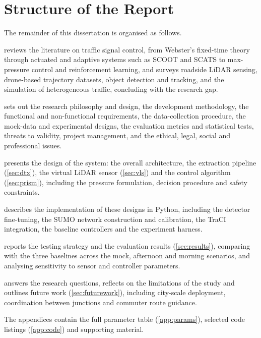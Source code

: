 \section{Structure of the Report}\label{sec:intro-structure}

The remainder of this dissertation is organised as follows.

 reviews the literature on traffic signal control, from Webster's fixed-time theory through actuated and adaptive systems such as SCOOT and SCATS to max-pressure control and reinforcement learning, and surveys roadside LiDAR sensing, drone-based trajectory datasets, object detection and tracking, and the simulation of heterogeneous traffic, concluding with the research gap.

 sets out the research philosophy and design, the development methodology, the functional and non-functional requirements, the data-collection procedure, the mock-data and experimental designs, the evaluation metrics and statistical tests, threats to validity, project management, and the ethical, legal, social and professional issues.

 presents the design of the system: the overall architecture, the \dtx{} extraction pipeline (\cref{sec:dtx}), the virtual LiDAR sensor (\cref{sec:vls}) and the \prism{} control algorithm (\cref{sec:prism}), including the pressure formulation, decision procedure and safety constraints.

 describes the implementation of these designs in Python, including the detector fine-tuning, the SUMO network construction and calibration, the TraCI integration, the baseline controllers and the experiment harness.

 reports the testing strategy and the evaluation results (\cref{sec:results}), comparing \prism{} with the three baselines across the mock, afternoon and morning scenarios, and analysing sensitivity to sensor and controller parameters.

 answers the research questions, reflects on the limitations of the study and outlines future work (\cref{sec:futurework}), including city-scale deployment, coordination between junctions and commuter route guidance.

The appendices contain the full parameter table (\cref{app:params}), selected code listings (\cref{app:code}) and supporting material.
